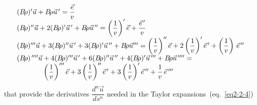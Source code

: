\begin{equation}
	\begin{array}{l}
		(\Br )^\prime\vec  u + \Br\vec  u^{\,\prime}   = \dfrac{\vec e}{ v}\\
		 (\Br )^{\prime\prime}\vec  u + 2 (\Br)^\prime \vec  u^{\,\prime} 
		     +\Br\vec  u^{\,\prime\prime}   = \left(\dfrac{1}{v}\right)^\prime\vec  e 
		         + \dfrac{\vec  e^{\,\prime}}{v} \\
		(\Br)^{\prime\prime\prime}\vec  u + 3(\Br)^{\prime\prime}\vec  u^{\,\prime}
		      + 3(\Br)^\prime \vec  u^{\,\prime\prime} 
		      +\Br\vec  u^{\prime\prime\prime}   =
		      \left(\dfrac{1}{ v}\right)^{\prime\prime}\vec  e +
		      2\left( \dfrac{1}{v}\right)^\prime \vec  e^{\,\prime} 
		      +\left(\dfrac{1}{v}\right)\, \vec  e^{\,\prime\prime}\\
		(\Br )^{\quaprime} \vec u + 4(\Br)^{\prime\prime\prime} \vec  u^{\,\prime} 
		      + 6(\Br)^{\prime\prime}\vec  u^{\,\prime\prime} 
		      +4 (\Br)^\prime\vec  u^{\,\prime\prime\prime} 
		      +\Br\vec  u^{\quaprime} = \\
		\hphantom{(\Br )^{\quaprime} \vec u}
		\left(\dfrac{1}{v}\right)^{\prime\prime\prime}\vec e
		      +3\left(\dfrac{1}{v}\right)^{\prime\prime}\vec  e^{\,\prime} 
		      +3\left(\dfrac{1}{ v}\right)^\prime\vec e^{\,\prime\prime} +
		      \dfrac{1}{v} \,\vec  e^{\,\prime\prime\prime}
	\end{array}
	\label{eq2-2-9}
\end{equation} 
%
that provide the derivatives $ \dfrac{d^n\vec  u}{ds^n}$ needed in the Taylor 
expansions~(eq.~\ref{eq2-2-4})

